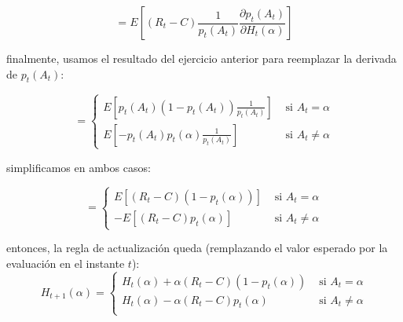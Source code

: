 \documentclass[12pt,a4paper]{article}
\begin{document}
$$ = E[(R_t -C) \frac{1}{p_t(A_t)} \frac{\partial p_t(A_t)}{\partial H_t(\alpha)}] $$

finalmente, usamos el resultado del ejercicio anterior para reemplazar la derivada de $p_t(A_t)$:

$$ = 
\begin{cases}
E[p_t(A_t)(1 - p_t(A_t)) \frac{1}{p_t(A_t)}] & \text{ si } A_t = \alpha \\
E[-p_t(A_t)p_t(\alpha) \frac{1}{p_t(A_t)}] & \text{ si } A_t \neq \alpha
\end{cases} $$

simplificamos en ambos casos:

$$ = 
\begin{cases}
E[(R_t -C)(1 - p_t(\alpha))] & \text{ si } A_t = \alpha \\
-E[(R_t -C)p_t(\alpha)] & \text{ si } A_t \neq \alpha
\end{cases} $$

entonces, la regla de actualización queda (remplazando el valor esperado por la evaluación en el instante $t$):
$$ H_{t+1}(\alpha) =
\begin{cases} 
    H_t(\alpha) + \alpha (R_t - C)(1 - p_t(\alpha)) & \text{ si } A_t = \alpha \\
    H_t(\alpha) - \alpha (R_t - C)p_t(\alpha) & \text{ si } A_t \neq \alpha \\
\end{cases} $$
\end{document}

